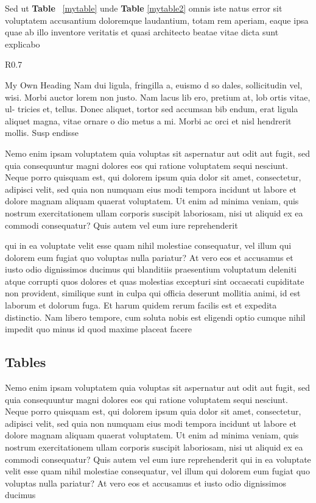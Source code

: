 \documentclass[12pt,a4paper]{report}
\begin{document}
Sed ut \textbf{Table} ~\ref{mytable} unde \textbf{Table} \ref{mytable2} omnis iste natus error sit voluptatem accusantium doloremque laudantium, totam rem aperiam, eaque ipsa quae ab illo inventore veritatis et quasi architecto beatae vitae dicta sunt explicabo
%
\begin{wrapfigure}{R}{0.7\textwidth}
	\begin{sidebar}{My Own Heading}
		Nam dui ligula, fringilla a, euismo d so dales, sollicitudin vel, wisi. Morbi auctor lorem non justo. Nam lacus lib ero, pretium at, lob ortis vitae, ul- tricies et, tellus. Donec aliquet, tortor sed accumsan bib endum, erat ligula aliquet magna, vitae ornare o dio metus a mi. Morbi ac orci et nisl hendrerit mollis. Susp endisse
	\end{sidebar}
\end{wrapfigure}
%
Nemo enim ipsam voluptatem quia voluptas sit aspernatur aut odit aut fugit, sed quia consequuntur magni dolores eos qui ratione voluptatem sequi nesciunt. Neque porro quisquam est, qui dolorem ipsum quia dolor sit amet, consectetur, adipisci velit, sed quia non numquam eius modi tempora incidunt ut labore et dolore magnam aliquam quaerat voluptatem. Ut enim ad minima veniam, quis nostrum exercitationem ullam corporis suscipit laboriosam, nisi ut aliquid ex ea commodi consequatur? Quis autem vel eum iure reprehenderit 

qui in ea voluptate velit esse quam nihil molestiae consequatur, vel illum qui dolorem eum fugiat quo voluptas nulla pariatur? At vero eos et accusamus et iusto odio dignissimos ducimus qui blanditiis praesentium voluptatum deleniti atque corrupti quos dolores et quas molestias excepturi sint occaecati cupiditate non provident, similique sunt in culpa qui officia deserunt mollitia animi, id est laborum et dolorum fuga. Et harum quidem rerum facilis est et expedita distinctio. Nam libero tempore, cum soluta nobis est eligendi optio cumque nihil impedit quo minus id quod maxime placeat facere
%
\subsection{Tables}
%
Nemo enim ipsam voluptatem quia voluptas sit aspernatur aut odit aut fugit, sed quia consequuntur magni dolores eos qui ratione voluptatem sequi nesciunt. Neque porro quisquam est, qui dolorem ipsum quia dolor sit amet, consectetur, adipisci velit, sed quia non numquam eius modi tempora incidunt ut labore et dolore magnam aliquam quaerat voluptatem. Ut enim ad minima veniam, quis nostrum exercitationem ullam corporis suscipit laboriosam, nisi ut aliquid ex ea commodi consequatur? Quis autem vel eum iure reprehenderit qui in ea voluptate velit esse quam nihil molestiae consequatur, vel illum qui dolorem eum fugiat quo voluptas nulla pariatur? At vero eos et accusamus et iusto odio dignissimos ducimus \\
\end{document}
